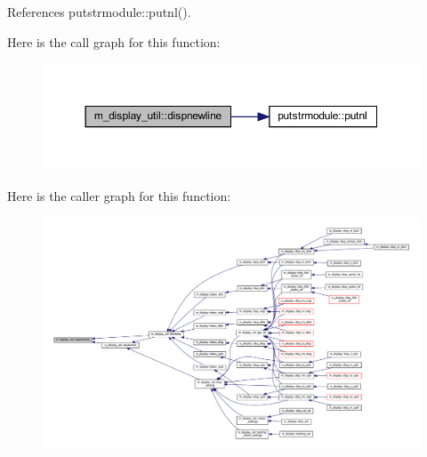 References putstrmodule\+::putnl().

Here is the call graph for this function\+:
\nopagebreak
\begin{figure}[H]
\begin{center}
\leavevmode
\includegraphics[width=350pt]{namespacem__display__util_a0bbd58b5406fa166a20d83f9737c7acd_cgraph}
\end{center}
\end{figure}
Here is the caller graph for this function\+:
\nopagebreak
\begin{figure}[H]
\begin{center}
\leavevmode
\includegraphics[width=350pt]{namespacem__display__util_a0bbd58b5406fa166a20d83f9737c7acd_icgraph}
\end{center}
\end{figure}
\mbox{\label{namespacem__display__util_abcd2aebb4cd373005b4d1fc4359a2d01}} 

